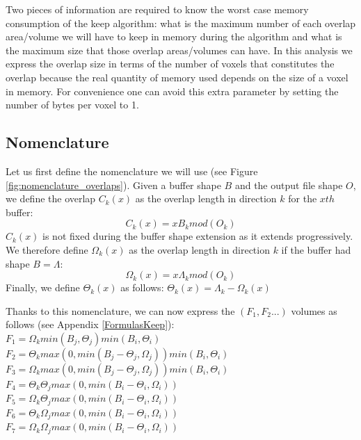 \documentclass[conference]{IEEEtran}
\begin{document}
Two pieces of information are required to know the worst case memory consumption of the keep algorithm: what is the maximum number of each overlap area/volume we will have to keep in memory during the algorithm and what is the maximum size that those overlap areas/volumes can have.
In this analysis we express the overlap size in terms of the number of voxels that constitutes the overlap because the real quantity of memory used depends on the size of a voxel in memory.
For convenience one can avoid this extra parameter by setting the number of bytes per voxel to 1.

\subsection{Nomenclature}
Let us first define the nomenclature we will use (see Figure \ref{fig:nomenclature_overlaps}).
Given a buffer shape $B$ and the output file shape $O$, we define the overlap $C_k(x)$ as the overlap length in direction $k$ for the $x{th}$ buffer:
$$C_k(x) = xB_k mod(O_k)$$
$C_k(x)$ is not fixed during the buffer shape extension as it extends progressively.
We therefore define $\Omega_k(x)$ as the overlap length in direction $k$ if the buffer had shape $B=\Lambda$:
$$\Omega_k(x) = x\Lambda_k mod(O_k)$$
Finally, we define $\Theta_k(x)$ as follows:
$\Theta_k(x) = \Lambda_k - \Omega_k(x)$

Thanks to this nomenclature, we can now express the $(F_1, F_2...)$ volumes as follows (see Appendix \ref{FormulasKeep}): \\
$F_1 = \Omega_k min(B_j, \Theta_j) min(B_i, \Theta_i)$ \\
$F_2 = \Theta_k max(0, min(B_j - \Theta_j, \Omega_j)) min(B_i, \Theta_i)$ \\
$F_3 = \Omega_k max(0, min(B_j - \Theta_j, \Omega_j)) min(B_i, \Theta_i)$ \\
$F_4 = \Theta_k \Theta_j max(0, min(B_i-\Theta_i, \Omega_i))$ \\
$F_5 = \Omega_k \Theta_j max(0, min(B_i-\Theta_i, \Omega_i))$ \\
$F_6 = \Theta_k \Omega_j max(0, min(B_i-\Theta_i, \Omega_i))$ \\
$F_7 = \Omega_k \Omega_j max(0, min(B_i-\Theta_i, \Omega_i))$ \\
\end{document}
